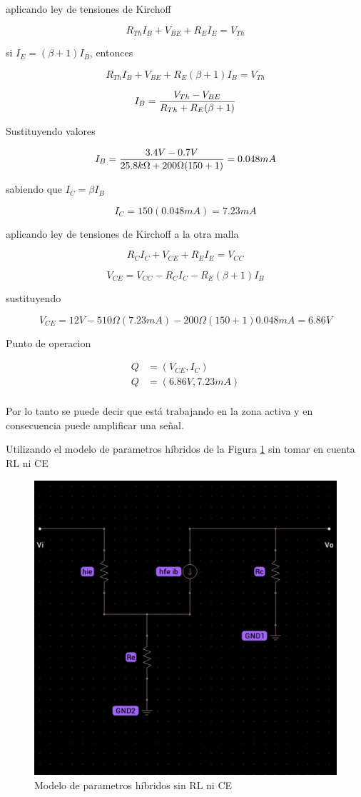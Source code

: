 \documentclass[12pt, a4paper]{article}
\begin{document}
    aplicando ley de tensiones de Kirchoff

    $$R_{Th}I_B + V_{BE} + R_EI_E = V_{Th}$$

    si $I_E = (\beta + 1)I_B$, entonces

    $$R_{Th}I_B + V_{BE} + R_E(\beta + 1)I_B = V_{Th}$$

    $$I_B = {V_{Th} - V_{BE} \over R_{Th} + R_E(\beta + 1)}$$

    Sustituyendo valores

    $$I_B = {3.4V - 0.7V \over 25.8k\Omega + 200\Omega(150 + 1)} = 0.048mA$$

    sabiendo que $I_C = \beta I_B$

    $$I_C = 150(0.048mA) = 7.23mA$$

    aplicando ley de tensiones de Kirchoff a la otra malla

    $$R_{C}I_C + V_{CE} + R_EI_E = V_{CC}$$

    $$V_{CE} = V_{CC} - R_{C}I_C - R_E(\beta + 1)I_B$$

    sustituyendo

    $$V_{CE} = 12V - 510\Omega (7.23mA) - 200\Omega (150 + 1) 0.048mA = 6.86V$$

    Punto de operacion

    \begin{equation} \label{eqQ}
        \begin{split}
            Q & = (V_{CE}, I_C) \\
            Q & = (6.86V, 7.23mA) \\
        \end{split}
    \end{equation}

    Por lo tanto se puede decir que está trabajando en la zona activa y en consecuencia puede amplificar una señal.

    Utilizando el modelo de parametros híbridos de la Figura \ref{fig:h1} sin tomar en cuenta RL ni CE

    \begin{figure}[h!]
        \centering
        \includegraphics[height=4cm\textwidth]{h1.jpg} \par
        \caption{Modelo de parametros híbridos sin RL ni CE}
        \label{fig:h1}
    \end{figure}
\end{document}
